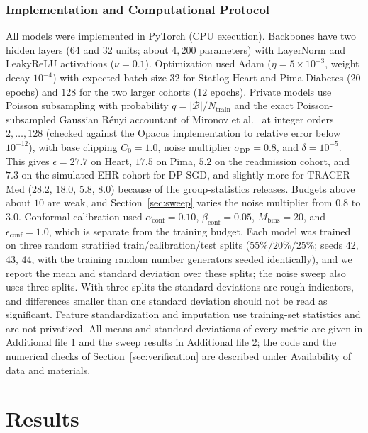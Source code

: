 \documentclass[pdflatex,sn-vancouver-num,referee,lineno]{sn-jnl}
\theoremstyle{thmstyleone}
\theoremstyle{thmstylethree}
\begin{document}
\subsubsection{Implementation and Computational Protocol}
All models were implemented in PyTorch (CPU execution). Backbones have two hidden layers (64 and 32 units; about $4{,}200$ parameters) with LayerNorm and LeakyReLU activations ($\nu = 0.1$). Optimization used Adam ($\eta = 5 \times 10^{-3}$, weight decay $10^{-4}$) with expected batch size $32$ for Statlog Heart and Pima Diabetes ($20$ epochs) and $128$ for the two larger cohorts ($12$ epochs). Private models use Poisson subsampling with probability $q = |\mathcal{B}|/N_{\text{train}}$ and the exact Poisson-subsampled Gaussian R\'enyi accountant of Mironov et al.~\cite{mironov2019renyi} at integer orders $2,\dots,128$ (checked against the Opacus implementation to relative error below $10^{-12}$), with base clipping $C_0=1.0$, noise multiplier $\sigma_{\text{DP}}=0.8$, and $\delta = 10^{-5}$. This gives $\epsilon = 27.7$ on Heart, $17.5$ on Pima, $5.2$ on the readmission cohort, and $7.3$ on the simulated EHR cohort for DP-SGD, and slightly more for TRACER-Med ($28.2$, $18.0$, $5.8$, $8.0$) because of the group-statistics releases. Budgets above about $10$ are weak, and Section~\ref{sec:sweep} varies the noise multiplier from $0.8$ to $3.0$. Conformal calibration used $\alpha_{\text{conf}} = 0.10$, $\beta_{\text{conf}} = 0.05$, $M_{\text{bins}} = 20$, and $\epsilon_{\text{conf}} = 1.0$, which is separate from the training budget. Each model was trained on three random stratified train/calibration/test splits ($55\%/20\%/25\%$; seeds 42, 43, 44, with the training random number generators seeded identically), and we report the mean and standard deviation over these splits; the noise sweep also uses three splits. With three splits the standard deviations are rough indicators, and differences smaller than one standard deviation should not be read as significant. Feature standardization and imputation use training-set statistics and are not privatized. All means and standard deviations of every metric are given in Additional file 1 and the sweep results in Additional file 2; the code and the numerical checks of Section~\ref{sec:verification} are described under Availability of data and materials.

\section{Results}
\label{sec:results}
\end{document}
